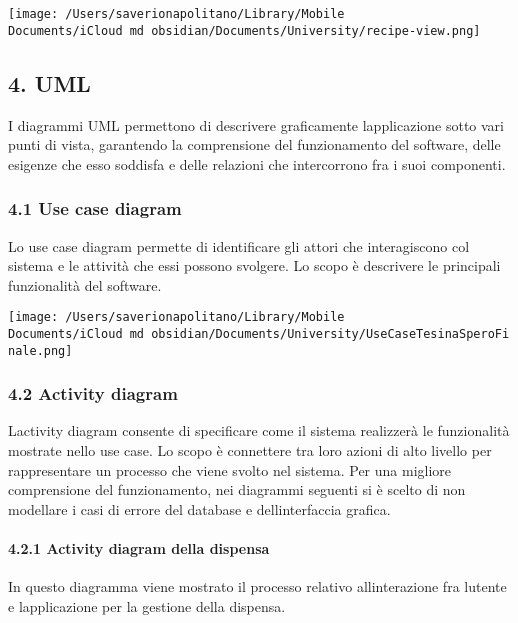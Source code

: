 \documentclass[
]{article}
\begin{document}
\texttt{[image: /Users/saverionapolitano/Library/Mobile Documents/iCloud~md~obsidian/Documents/University/recipe-view.png]}

\subsection{4. UML}\label{uml}

I diagrammi UML permettono di descrivere graficamente
l\textquotesingle applicazione sotto vari punti di vista, garantendo la
comprensione del funzionamento del software, delle esigenze che esso
soddisfa e delle relazioni che intercorrono fra i suoi componenti.

\subsubsection{4.1 Use case diagram}\label{use-case-diagram}

Lo use case diagram permette di identificare gli attori che
interagiscono col sistema e le attività che essi possono svolgere. Lo
scopo è descrivere le principali funzionalità del software.

\texttt{[image: /Users/saverionapolitano/Library/Mobile Documents/iCloud~md~obsidian/Documents/University/UseCaseTesinaSperoFinale.png]}

\subsubsection{4.2 Activity diagram}\label{activity-diagram}

L\textquotesingle activity diagram consente di specificare come il
sistema realizzerà le funzionalità mostrate nello use case. Lo scopo è
connettere tra loro azioni di alto livello per rappresentare un processo
che viene svolto nel sistema. Per una migliore comprensione del
funzionamento, nei diagrammi seguenti si è scelto di non modellare i
casi di errore del database e dell\textquotesingle interfaccia grafica.

\paragraph{4.2.1 Activity diagram della
dispensa}\label{activity-diagram-della-dispensa}

In questo diagramma viene mostrato il processo relativo
all\textquotesingle interazione fra l\textquotesingle utente e
l\textquotesingle applicazione per la gestione della dispensa.
\end{document}
